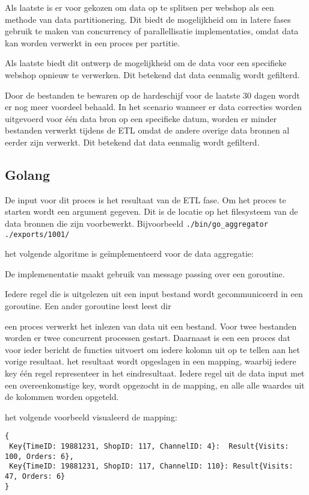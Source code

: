 Als laatste is er voor gekozen om data op te splitsen per webshop als een methode van data partitionering. Dit biedt de mogelijkheid om in latere fases gebruik te maken van concurrency of parallellisatie implementaties, omdat data kan worden verwerkt in een proces per partitie.

Als laatste biedt dit ontwerp de mogelijkheid om de data voor een specifieke webshop opnieuw te verwerken. Dit betekend dat data eenmalig wordt gefilterd. 

Door de bestanden te bewaren op de hardeschijf voor de laatste 30 dagen wordt er nog meer voordeel behaald.
In het scenario wanneer er data correcties worden uitgevoerd voor één data bron op een specifieke datum, worden er minder bestanden verwerkt tijdens de ETL omdat de andere overige data bronnen al eerder zijn verwerkt. Dit betekend dat data eenmalig wordt gefilterd.

\subsection{Golang}

De input voor dit proces is het resultaat van de ETL fase. Om het proces te starten wordt een argument gegeven. Dit is de locatie op het filesysteem van de data bronnen die zijn voorbewerkt. Bijvoorbeeld
\verb+./bin/go_aggregator ./exports/1001/+

het volgende algoritme is geïmplementeerd voor de data aggregatie:

De implemenentatie maakt gebruik van message passing over een goroutine. 

Iedere regel die is uitgelezen uit een input bestand wordt gecommuniceerd in een goroutine.
Een ander goroutine leest leest dir 

een proces verwerkt het inlezen van data uit een bestand. Voor twee bestanden worden er twee concurrent processen gestart. 
Daarnaast is een een proces dat voor ieder bericht de functies uitvoert om iedere kolomn uit op te tellen aan het vorige resultaat.
het resultaat wordt opgeslagen in een mapping, waarbij iedere key één regel representeer in het eindresultaat. Iedere regel uit de data input met een overeenkomstige key, wordt opgezocht in de mapping, en alle alle waardes uit de kolommen worden opgeteld.

het volgende voorbeeld visualeerd de mapping:
\begin{verbatim}
{
 Key{TimeID: 19881231, ShopID: 117, ChannelID: 4}:  Result{Visits: 100, Orders: 6},
 Key{TimeID: 19881231, ShopID: 117, ChannelID: 110}: Result{Visits: 47, Orders: 6}
}
\end{verbatim}

